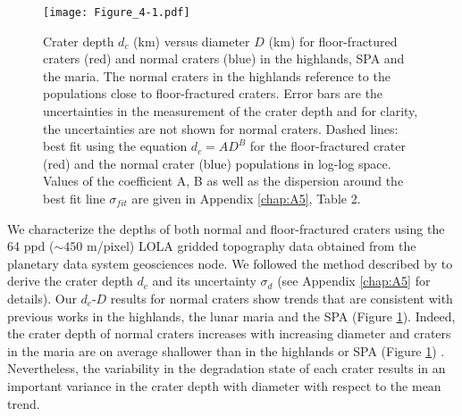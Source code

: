 \begin{figure}[h!]
  \graphicspath{ {/Users/thorey/Documents/These/Projet/FFC/Gravi_GRAIL/Article/Papier/SOUMISSION_2_EPSL/} }
  \begin{center}

    \texttt{[image: Figure\_4-1.pdf]}

    \caption{Crater  depth $d_c$  (km)  versus diameter  $D$ (km)  for
      floor-fractured craters  (red) and normal craters  (blue) in the
      highlands,  SPA  and  the  maria.  The  normal  craters  in  the
      highlands reference to the  populations close to floor-fractured
      craters.  Error bars are the uncertainties in the measurement of
      the  crater depth  and for  clarity, the  uncertainties are  not
      shown  for normal  craters.  Dashed  lines: best  fit using  the
      equation $d_c =  AD^B$ for the floor-fractured  crater (red) and
      the normal  crater (blue) populations in  log-log space.  Values
      of the  coefficient A, B  as well  as the dispersion  around the
      best   fit   line   $\sigma_{fit}$   are   given   in   Appendix
      \ref{chap:A5}, Table 2.}
    \label{Figure4-1}
  \end{center}
\end{figure}


We characterize the depths of  both normal and floor-fractured craters
using  the 64  ppd ($\sim450$  m/pixel) LOLA  gridded topography  data
\citep{Zuber:2009bq}   obtained  from   the   planetary  data   system
geosciences   node.     We   followed   the   method    described   by
\citet{Kalynn:2013fg}  to  derive  the  crater  depth  $d_c$  and  its
uncertainty  $\sigma_{d}$ (see  Appendix  \ref{chap:A5} for  details).
Our  $d_c$-$D$  results  for  normal  craters  show  trends  that  are
consistent with previous  works in the highlands, the  lunar maria and
the SPA (Figure \ref{Figure4-1}).  Indeed,  the crater depth of normal
craters increases  with increasing diameter  and craters in  the maria
are  on  average  shallower  than  in the  highlands  or  SPA  (Figure
\ref{Figure4-1})        \citep{Pike:1974ux,Pike:1980eh,Kalynn:2013fg}.
Nevertheless, the variability in the  degradation state of each crater
results in  an important  variance in the  crater depth  with diameter
with respect to the mean trend.

